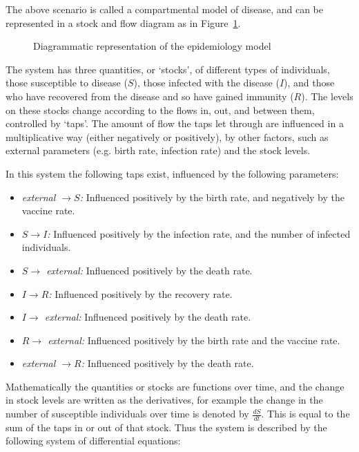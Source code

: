 The above scenario is called a compartmental model of disease, and can be
represented in a stock and flow diagram as in Figure~\ref{fig:stockflow}.

\begin{figure}
    \begin{center}
        
        \caption{Diagrammatic representation of the epidemiology model}
        \label{fig:stockflow}
    \end{center}
\end{figure}

The system has three quantities, or `stocks', of different types of individuals,
those susceptible to disease ($S$), those infected with the disease ($I$), and
those who have recovered from the disease and so have gained immunity ($R$). The
levels on these stocks change according to the flows in, out, and between them,
controlled by `taps'. The amount of flow the taps let through are influenced in
a multiplicative way (either negatively or positively), by other factors, such
as external parameters (e.g. birth rate, infection rate) and the stock levels.

In this system the following taps exist, influenced by the following parameters:

\begin{itemize}
  \item \textit{external $\rightarrow S$:} Influenced positively by the birth
  rate, and negatively by the vaccine rate.
  \item \textit{$S \rightarrow I$:} Influenced positively by the infection rate,
  and the number of infected individuals.
  \item \textit{$S \rightarrow$ external:} Influenced positively by the death
  rate.
  \item \textit{$I \rightarrow R$:} Influenced positively by the recovery rate.
  \item \textit{$I \rightarrow$ external:} Influenced positively by the death
  rate.
  \item \textit{$R \rightarrow$ external:} Influenced positively by the birth
  rate and the vaccine rate.
  \item \textit{external $\rightarrow R$:} Influenced positively by the death
  rate.
\end{itemize}

Mathematically the quantities or stocks are functions over time, and the change
in stock levels are written as the derivatives, for example the change in the
number of susceptible individuals over time is denoted by $\frac{dS}{dt}$. This
is equal to the sum of the taps in or out of that stock. Thus the system is
described by the following system of differential equations:

